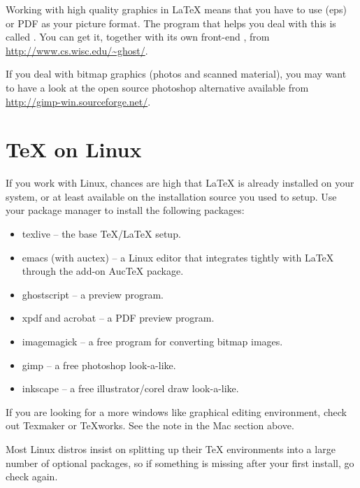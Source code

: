 Working with high quality graphics in \LaTeX{} means that you have to use
\EPSi{} (eps) or PDF as your picture format. The program that helps you
deal with this is called . You can get it, together with its
own front-end , from \url{http://www.cs.wisc.edu/~ghost/}.

If you deal with bitmap graphics (photos and scanned material), you may want
to have a look at the open source photoshop alternative  available
from \url{http://gimp-win.sourceforge.net/}.

\section{\TeX{} on Linux}

If you work with Linux, chances are high that \LaTeX{} is already installed
on your system, or at least available on the installation source you used to
setup. Use your package manager to install the following packages:

\begin{itemize}
\item texlive -- the base \TeX{}/\LaTeX{} setup.
\item emacs (with auctex) -- a Linux editor that integrates tightly with \LaTeX{} through the add-on AucTeX package.
\item ghostscript -- a \PSi{} preview program.
\item xpdf and acrobat -- a PDF preview program.
\item imagemagick -- a free program for converting bitmap images.
\item gimp -- a free photoshop look-a-like.
\item inkscape -- a free illustrator/corel draw look-a-like.
\end{itemize}

If you are looking for a more windows like graphical editing environment,
check out Texmaker or \TeX{}works. See the note in the Mac section above.

Most Linux distros insist on splitting up their \TeX{} environments into a
large number of optional packages, so if something is missing after your
first install, go check again.
